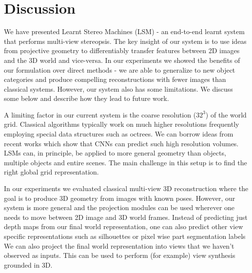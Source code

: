 \documentclass[../thesis.tex]{subfiles}
\begin{document}
\section{Discussion}
We have presented Learnt Stereo Machines (LSM) - an end-to-end learnt system that performs multi-view stereopsis. The key insight of our system is to use ideas from projective geometry to differentiably transfer features between 2D images and the 3D world and vice-versa. In our experiments we showed the benefits of our formulation over direct methods - we are able to generalize to new object categories and produce compelling reconstructions with fewer images than classical systems. However, our system also has some limitations. We discuss some below and describe how they lead to future work.

A limiting factor in our current system is the coarse resolution ($32^3$) of the world grid. Classical algorithms typically work on much higher resolutions frequently employing special data structures such as octrees. We can borrow ideas from recent works \cite{riegler2017octnetfusion,hane2017hierarchical} which show that CNNs can predict such high resolution volumes. LSMs can, in principle, be applied to more general geometry than objects, \eg multiple objects and entire scenes. The main challenge in this setup is to find the right global grid representation.

In our experiments we evaluated classical multi-view 3D reconstruction where the goal is to produce 3D geometry from images with known poses. However, our system is more general and the projection modules can be used wherever one needs to move between 2D image and 3D world frames. Instead of predicting just depth maps from our final world representation, one can also predict other view specific representations such as silhouettes or pixel wise part segmentation labels \etc We can also project the final world representation into views that we haven't observed as inputs. This can be used to perform (for example) view synthesis grounded in 3D.
\end{document}
